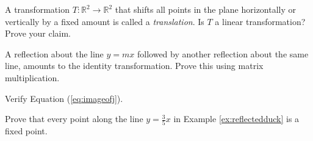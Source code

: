 \documentclass{ximera}
\newcommand{\RR}{\mathbb{R}}
\newcommand{\dfn}{\textit}
\begin{document}
\begin{problem}\label{prob:translationtrans}
A transformation $T:\RR^2\rightarrow \RR^2$ that shifts all points in the plane horizontally or vertically by a fixed amount is called a \dfn{translation}.  Is $T$ a linear transformation?  Prove your claim.
\end{problem}

\begin{problem}\label{prob:reflectreflect} A reflection about the line $y=mx$ followed by another reflection about the same line, amounts to the identity transformation.  Prove this using matrix multiplication.
\end{problem}

\begin{problem} \label{prob:imageofj}
Verify Equation (\ref{eq:imageofj}).
\end{problem}

\begin{problem}\label{prob:fixedpoint}
Prove that every point along the line $y=\frac{3}{5}x$ in Example \ref{ex:reflectedduck} is a fixed point.
\end{problem}
\end{document}
